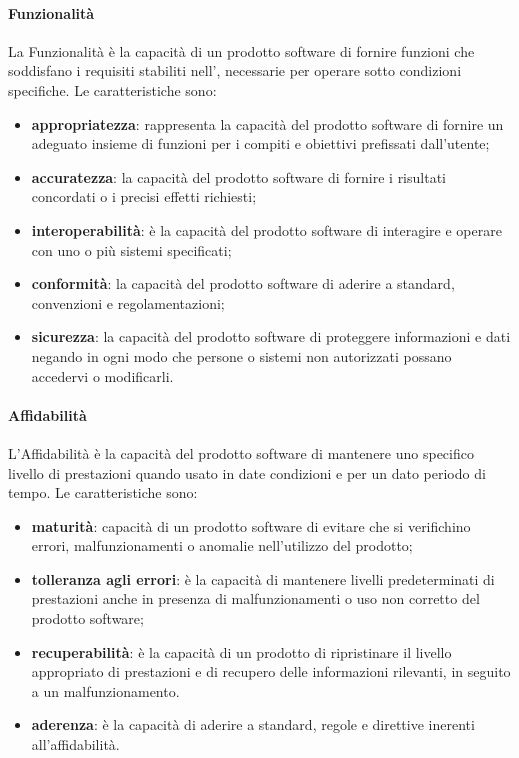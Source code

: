 \paragraph{Funzionalità}
La Funzionalità è la capacità di un prodotto software di fornire funzioni che soddisfano i requisiti stabiliti nell', necessarie per operare sotto condizioni specifiche.
Le caratteristiche sono:
\begin{itemize}
\item \textbf{appropriatezza}: rappresenta la capacità del prodotto software di fornire un adeguato insieme di funzioni per i compiti e obiettivi prefissati dall'utente;
\item \textbf{accuratezza}: la capacità del prodotto software di fornire i risultati concordati o i precisi effetti richiesti;
\item \textbf{interoperabilità}: è la capacità del prodotto software di interagire e operare con uno o più sistemi specificati;
\item \textbf{conformità}: la capacità del prodotto software di aderire a standard, convenzioni e regolamentazioni;
\item \textbf{sicurezza}: la capacità del prodotto software di proteggere informazioni e dati negando in ogni modo che persone o sistemi non autorizzati possano accedervi o modificarli.
\end{itemize}

\paragraph{Affidabilità}
L'Affidabilità è la capacità del prodotto software di mantenere uno specifico livello di prestazioni quando usato in date condizioni e per un dato periodo di tempo. Le caratteristiche sono:
\begin{itemize}
\item \textbf{maturità}: capacità di un prodotto software di evitare che si verifichino errori, malfunzionamenti o anomalie nell'utilizzo del prodotto;
\item \textbf{tolleranza agli errori}: è la capacità di mantenere livelli predeterminati di prestazioni anche in presenza di malfunzionamenti o uso non corretto del prodotto software;
\item \textbf{recuperabilità}: è la capacità di un prodotto di ripristinare il livello appropriato di prestazioni e di recupero delle informazioni rilevanti, in seguito a un malfunzionamento.
\item \textbf{aderenza}: è la capacità di aderire a standard, regole e direttive inerenti all'affidabilità.
\end{itemize}


